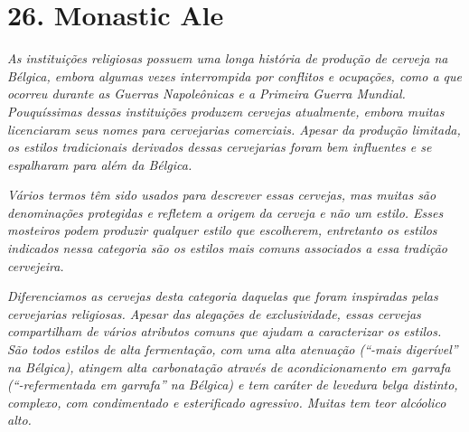 \section*{26. Monastic Ale}
\textit{As instituições religiosas possuem uma longa história de produção de cerveja na Bélgica, embora algumas vezes interrompida por conflitos e ocupações, como a que ocorreu durante as Guerras Napoleônicas e a Primeira Guerra Mundial. Pouquíssimas dessas instituições produzem cervejas atualmente, embora muitas licenciaram seus nomes para cervejarias comerciais. Apesar da produção limitada, os estilos tradicionais derivados dessas cervejarias foram bem influentes e se espalharam para além da Bélgica.}

\textit{Vários termos têm sido usados para descrever essas cervejas, mas muitas são denominações protegidas e refletem a origem da cerveja e não um estilo. Esses mosteiros podem produzir qualquer estilo que escolherem, entretanto os estilos indicados nessa categoria são os estilos mais comuns associados a essa tradição cervejeira.}

\textit{Diferenciamos as cervejas desta categoria daquelas que foram inspiradas pelas cervejarias religiosas. Apesar das alegações de exclusividade, essas cervejas compartilham de vários atributos comuns que ajudam a caracterizar os estilos. São todos estilos de alta fermentação, com uma alta atenuação (“-mais digerível” na Bélgica), atingem alta carbonatação através de acondicionamento em garrafa (“-refermentada em garrafa” na Bélgica) e tem caráter de levedura belga distinto, complexo, com condimentado e esterificado agressivo. Muitas tem teor alcóolico alto.}
